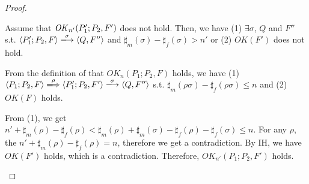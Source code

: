 \begin{proof}
\begin{itemize}
  Assume that \(\mathit{OK}_{n'}(P_1';P_2, F') \) does not hold. Then, we have (1) \(
  \exists \sigma \), \(Q\) and \(F''\) s.t. \( \langle P_1';P_2, F \rangle
  \xlongrightarrow{\sigma} \langle Q, F'' \rangle \) and
  \(\sharp_{m}(\sigma) - \sharp_{f}(\sigma) > n'\) or (2) \( OK(F')\)
  does not hold.

  From the definition of that \(OK_n(P_1;P_2, F)\) holds, we have
  (1) \( \langle P_1;P_2, F \rangle \xLongrightarrow{\rho} \langle P_1';P_2, F'
  \rangle \xlongrightarrow{\sigma} \langle Q, F'' \rangle \)
  s.t. \(\sharp_m(\rho\sigma) - \sharp_f(\rho\sigma) \le n \) and (2)
  \(OK(F)\) holds.

  From (1), we get \( n' + \sharp_m(\rho) - \sharp_f(\rho) <
  \sharp_m(\rho) + \sharp_m(\sigma) - \sharp_f(\rho) -
  \sharp_f(\sigma) \le n\). For any \(\rho\), the \( n' +
  \sharp_m(\rho) - \sharp_f(\rho) = n\), therefore we get a
  contradiction. By IH, we have \(OK(F')\) holds, which is a
  contradiction. Therefore, \(OK_{n'}(P_1;P_2, F')\) holds.
  

\end{itemize}

\end{proof}

